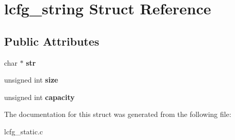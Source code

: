 \hypertarget{structlcfg__string}{\section{lcfg\+\_\+string Struct Reference}
\label{structlcfg__string}
}
\subsection*{Public Attributes}
\begin{DoxyCompactItemize}
\item 
\hypertarget{structlcfg__string_af9f8a270270c71a3ec2448369639f6f4}{char $\ast$ {\bfseries str}}\label{structlcfg__string_af9f8a270270c71a3ec2448369639f6f4}

\item 
\hypertarget{structlcfg__string_ad6fff99c12b91f5ccb7468cb50463c49}{unsigned int {\bfseries size}}\label{structlcfg__string_ad6fff99c12b91f5ccb7468cb50463c49}

\item 
\hypertarget{structlcfg__string_aa37e32181d18ca021994923fa80933b6}{unsigned int {\bfseries capacity}}\label{structlcfg__string_aa37e32181d18ca021994923fa80933b6}

\end{DoxyCompactItemize}


The documentation for this struct was generated from the following file\+:\begin{DoxyCompactItemize}
\item 
lcfg\+\_\+static.\+c\end{DoxyCompactItemize}
